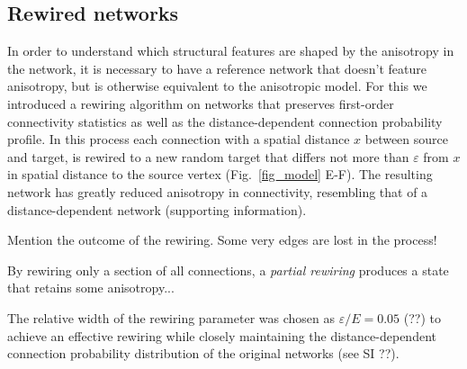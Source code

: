 \clearpage
\pagebreak
\newpage
\subsection*{Rewired networks}
%

%
In order to understand which structural features are shaped by the
anisotropy in the network, it is necessary to have a reference network
that doesn't feature anisotropy, but is otherwise equivalent to the
anisotropic model. For this we introduced a rewiring algorithm on
networks that preserves first-order connectivity statistics %
as well as the distance-dependent connection probability profile. In
this process each connection with a spatial distance $x$ between
source and target, is rewired to a new random target that differs not
more than $\varepsilon$ from $x$ in spatial distance to the source
vertex (Fig.~\ref{fig_model} E-F). The resulting network has greatly
reduced anisotropy in connectivity, resembling that of a
distance-dependent network (supporting information).

Mention the outcome of the rewiring. Some very edges are lost in the process! %

By rewiring only a section of all connections, a \textit{partial
  rewiring} produces a state that retains some anisotropy...



The relative width of the rewiring parameter was chosen as $\varepsilon / E = 0.05$ (??) to achieve an effective rewiring while closely maintaining the distance-dependent connection probability distribution of the original networks (see SI ??).
